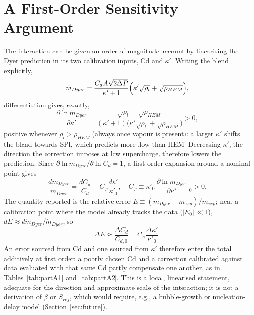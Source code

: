 \documentclass[11pt,a4paper]{article}
\newcommand{\mdot}{\dot m}
\begin{document}
\section{A First-Order Sensitivity Argument}\label{sec:sens}
The interaction can be given an order-of-magnitude account by linearising the Dyer prediction in its two calibration inputs, Cd and $\kappa'$. Writing the blend explicitly,
\begin{equation}
\mdot_{Dyer}=\frac{C_dA\sqrt{2\Delta P}}{\kappa'+1}\Bigl(\kappa'\sqrt{\rho_l}+\sqrt{\rho_{HEM}}\Bigr),
\label{eq:explicit}
\end{equation}
differentiation gives, exactly,
\begin{equation}
\frac{\partial\ln\mdot_{Dyer}}{\partial\kappa'}=\frac{\sqrt{\rho_l}-\sqrt{\rho_{HEM}}}{(\kappa'+1)\bigl(\kappa'\sqrt{\rho_l}+\sqrt{\rho_{HEM}}\bigr)}>0,
\label{eq:deriv}
\end{equation}
positive whenever $\rho_l>\rho_{HEM}$ (always once vapour is present): a larger $\kappa'$ shifts the blend towards SPI, which predicts more flow than HEM. Decreasing $\kappa'$, the direction the correction imposes at low supercharge, therefore lowers the prediction. Since $\partial\ln\mdot_{Dyer}/\partial\ln C_d=1$, a first-order expansion around a nominal point gives
\begin{equation}
\frac{d\mdot_{Dyer}}{\mdot_{Dyer}}=\frac{dC_d}{C_d}+C_\varphi\frac{d\kappa'}{\kappa'_0},\quad
C_\varphi\equiv\kappa'_0\,\frac{\partial\ln\mdot_{Dyer}}{\partial\kappa'}\Big|_0>0.
\label{eq:taylor}
\end{equation}
The quantity reported is the relative error $E\equiv(\mdot_{Dyer}-\mdot_{exp})/\mdot_{exp}$; near a calibration point where the model already tracks the data ($|E_0|\ll1$), $dE\approx d\mdot_{Dyer}/\mdot_{Dyer}$, so
\begin{equation}
\Delta E\approx\frac{\Delta C_d}{C_{d,0}}+C_\varphi\frac{\Delta\kappa'}{\kappa'_0}.
\label{eq:dE}
\end{equation}
An error sourced from Cd and one sourced from $\kappa'$ therefore enter the total additively at first order: a poorly chosen Cd and a correction calibrated against data evaluated with that same Cd partly compensate one another, as in Tables~\ref{tab:partA1} and~\ref{tab:partA2}. This is a local, linearised statement, adequate for the direction and approximate scale of the interaction; it is not a derivation of $\beta$ or $S_{ref}$, which would require, e.g., a bubble-growth or nucleation-delay model (Section~\ref{sec:future}).
\end{document}
